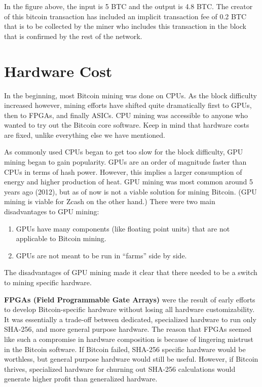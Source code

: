 \documentclass[11pt]{article}
\begin{document}
    In the figure above, the input is 5 BTC and the output is 4.8 BTC. The creator of this bitcoin transaction has included an implicit transaction fee of 0.2 BTC that is to be collected by the miner who includes this transaction in the block that is confirmed by the rest of the network.

    \section*{Hardware Cost}
    
    In the beginning, most Bitcoin mining was done on CPUs. As the block difficulty increased however, mining efforts have shifted quite dramatically first to GPUs, then to FPGAs, and finally ASICs. CPU mining was accessible to anyone who wanted to try out the Bitcoin core software. Keep in mind that hardware costs are fixed, unlike everything else we have mentioned. 
    
    As commonly used CPUs began to get too slow for the block difficulty, GPU mining began to gain popularity. GPUs are an order of magnitude faster than CPUs in terms of hash power. However, this implies a larger consumption of energy and higher production of heat. GPU mining was most common around 5 years ago (2012), but as of now is not a viable solution for mining Bitcoin. (GPU mining is viable for Zcash on the other hand.) There were two main disadvantages to GPU mining:
    
    \begin{enumerate}
        \item GPUs have many components (like floating point units) that are not applicable to Bitcoin mining.
        \item GPUs are not meant to be run in ``farms'' side by side.
    \end{enumerate}
    
    The disadvantages of GPU mining made it clear that there needed to be a switch to mining specific hardware.
    
    \textbf{FPGAs (Field Programmable Gate Arrays)} were the result of early efforts to develop Bitcoin-specific hardware without losing all hardware customizability. It was essentially a trade-off between dedicated, specialized hardware to run only SHA-256, and more general purpose hardware. The reason that FPGAs seemed like such a compromise in hardware composition is because of lingering mistrust in the Bitcoin software. If Bitcoin failed, SHA-256 specific hardware would be worthless, but general purpose hardware would still be useful. However, if Bitcoin thrives, specialized hardware for churning out SHA-256 calculations would generate higher profit than generalized hardware.
    
\end{document}
